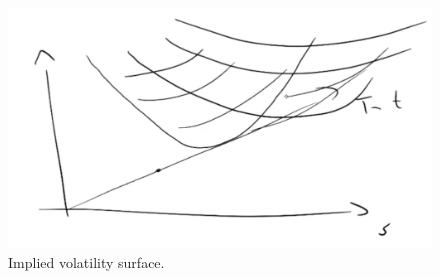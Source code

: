 \begin{figure}[htp]
    \centering
    \includegraphics[scale=0.3]{fig/tmp/fig19.png}
    \caption{Implied volatility surface.}
    \label{fig:implvolsurf}
\end{figure}

